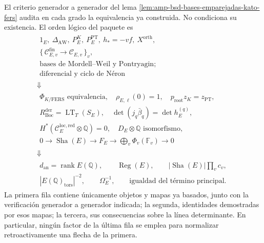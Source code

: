 El criterio generador a generador del
lema \ref{lem:amp-bsd-bases-emparejadas-kato-fers} audita en cada grado la
equivalencia ya construida. No condiciona su existencia. El orden lógico
del paquete es
\begin{equation}\label{eq:amp-bsd-diagrama-causal}
\begin{array}{c}
 \begin{gathered}
  1_E,\ \Delta_{\mathrm{AW}},\ P_E^K,\ P_E^{\mathrm{PT}},
  \ h_*=-vf,\ X^{\mathrm{orth}},\\
  \{\,\mathcal C_{E,v}^{\mathrm{fin}}\to\mathcal C_{E,v}\,\}_v,\\
  \text{bases de Mordell--Weil y Pontryagin;}\\
  \text{diferencial y ciclo de Néron}
 \end{gathered}
 \\[2mm]\Downarrow\\[-1mm]
 \begin{gathered}
  \Phi_{K/\mathrm{FERS}}\text{ equivalencia},\quad
  \rho_{E,\ell}(0)=1,\quad
  p_{\mathrm{root}}z_K=z_{\mathrm{PT}},\\
  R_{\mathrm{Boc}}^{\mathrm{der}}=\operatorname{LT}_T(S_E),\quad
  \det(j_q\bar\beta_q)=\det h_E^{(q)},\\
  H^*(\mathcal C_E^{\mathrm{loc,red}}\otimes\mathbb Q)=0,\quad
  D_E\otimes\mathbb Q\text{ isomorfismo},\\
  0\to\operatorname{Sha}(E)\to F_E
  \to\bigoplus_v\Phi_v(\mathbb F_v)\to0
 \end{gathered}
 \\[2mm]\Downarrow\\[-1mm]
 \begin{gathered}
  d_{\mathrm{an}}=\operatorname{rank}E(\mathbb Q),\qquad
  \operatorname{Reg}(E),\qquad
  |\operatorname{Sha}(E)|\prod_vc_v,\\
  |E(\mathbb Q)_{\mathrm{tors}}|^{-2},\qquad
  \Omega_E^{-1},\qquad
  \text{igualdad del término principal}.
 \end{gathered}
\end{array}
\end{equation}
La primera fila contiene únicamente objetos y mapas ya basados, junto con
la verificación generador a generador indicada; la segunda, identidades
demostradas por esos mapas; la tercera, sus consecuencias sobre la línea
determinante. En particular, ningún factor de la última fila se
emplea para normalizar retroactivamente una flecha de la primera.

